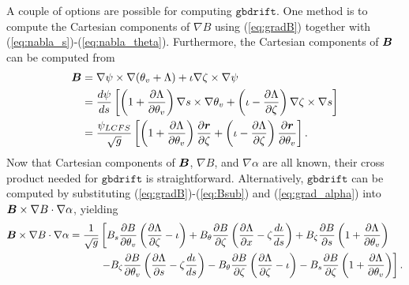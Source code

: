 \documentclass[11pt,letter]{article}
\newcommand{\vect}[1]{\mbox{\boldmath $#1$}}
\newcommand{\gbdrift}{\mathtt{gbdrift}}
\begin{document}
A couple of options are possible for computing $\gbdrift$. One method is to compute the Cartesian components of $\nabla B$ using
(\ref{eq:gradB})
together with (\ref{eq:nabla_s})-(\ref{eq:nabla_theta}). Furthermore, the Cartesian components of $\vect{B}$ can be computed from
\begin{align}
\vect{B} &= \nabla\psi \times \nabla (\theta_v + \Lambda) + \iota \nabla\zeta\times\nabla\psi \nonumber \\
&= \frac{d\psi}{ds} \left[ \left( 1 + \frac{\partial\Lambda}{\partial\theta_v}\right) \nabla s \times\nabla\theta_v 
+ \left(\iota - \frac{\partial\Lambda}{\partial\zeta}\right) \nabla\zeta\times\nabla s \right] \nonumber \\
&= \frac{\psi_{LCFS}}{\sqrt{g}} \left[ \left(1 + \frac{\partial\Lambda}{\partial\theta_v}\right) \frac{\partial\vect{r}}{\partial\zeta}
+ \left( \iota - \frac{\partial\Lambda}{\partial\zeta}\right) \frac{\partial\vect{r}}{\partial\theta_v}\right].
\end{align}
Now that Cartesian components of $\vect{B}$, $\nabla B$, and $\nabla \alpha$ are all known, their cross product
needed for $\gbdrift$ is straightforward. Alternatively, $\gbdrift$ can be computed by substituting (\ref{eq:gradB})-(\ref{eq:Bsub}) and (\ref{eq:grad_alpha}) into $\vect{B}\times\nabla B \cdot\nabla\alpha$, yielding
\begin{align}
\vect{B}\times\nabla B \cdot\nabla\alpha
=
\frac{1}{\sqrt{g}} &\left[
B_s \frac{\partial B}{\partial \theta_v} \left(\frac{\partial \Lambda}{\partial\zeta} - \iota \right)
+ B_\theta \frac{\partial B}{\partial\zeta} \left( \frac{\partial\Lambda}{\partial x} - \zeta \frac{d\iota}{ds}\right)
+ B_\zeta \frac{\partial B}{\partial s} \left( 1 + \frac{\partial \Lambda}{\partial \theta_v}\right) \right. \nonumber \\
&\left.-B_\zeta \frac{\partial B}{\partial\theta_v} \left( \frac{\partial\Lambda}{\partial s} - \zeta \frac{d\iota}{ds}\right)
-B_\theta \frac{\partial B}{\partial\zeta} \left( \frac{\partial \Lambda}{\partial\zeta}-\iota\right)
-B_s \frac{\partial B}{\partial\zeta} \left( 1 + \frac{\partial\Lambda}{\partial\theta_v}\right)
\right].
\end{align}
\end{document}
